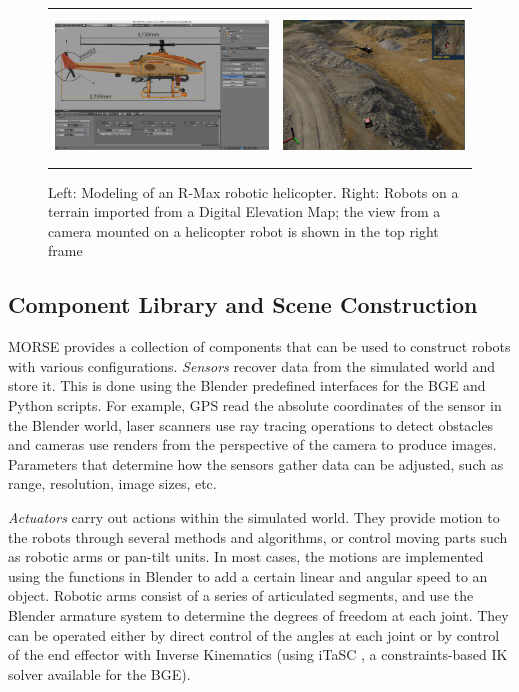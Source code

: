\documentclass{llncs}
\begin{document}
\begin{figure}[ht!]
\centering
\begin{tabular}{cc}
 \includegraphics[height=1.55in]{pics/MORSE-rmax_mesh.png} &
 \includegraphics[height=1.55in]{pics/MORSE-quarry_ok-1.png}
\end{tabular}
\caption{Left: Modeling of an R-Max robotic helicopter. Right: Robots on a
    terrain imported from a Digital Elevation Map; the view from a camera mounted
    on a helicopter robot is shown in the top right frame}
\label{fig:models}
\end{figure}


\subsection{Component Library and Scene Construction}
\label{section:components}

MORSE provides a collection of components that can be used to construct robots
with various configurations.
\emph{Sensors} recover data from the simulated world and store it. This is
done using the Blender predefined interfaces for the BGE and Python scripts.
For example, GPS read the absolute coordinates of the sensor in the
Blender world, laser scanners use ray tracing operations to detect
obstacles and cameras use renders from the perspective of the camera to
produce images. Parameters that determine how the sensors gather data can
be adjusted, such as range, resolution, image sizes, etc.

\emph{Actuators} carry out actions within the simulated
world. They provide motion to the robots through several
methods and algorithms, or control moving parts such as robotic arms or
pan-tilt units. In most cases, the motions are implemented using the
functions in Blender to add a certain linear and angular speed to an
object.
Robotic arms consist of a series of articulated segments, and use the
Blender armature system to determine the degrees of freedom at each joint.
They can be operated either by direct control of the angles at each joint
or by control of the end effector with Inverse Kinematics (using iTaSC
\cite{iTaSC}, a constraints-based IK solver available for the BGE).
\end{document}

